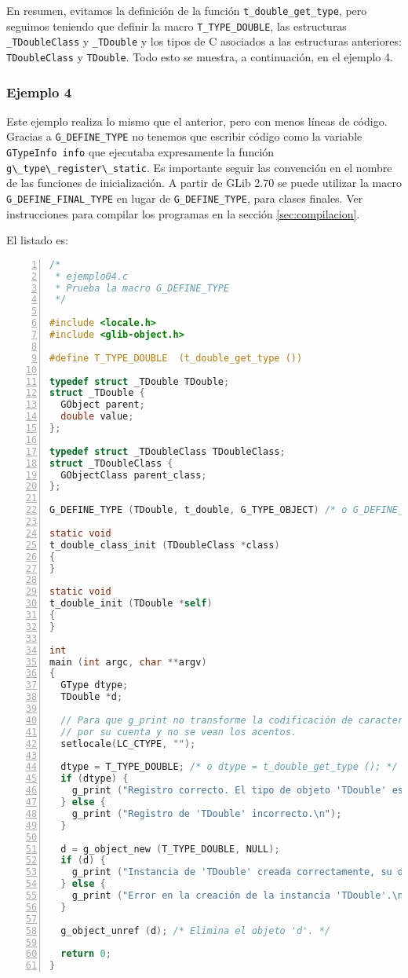 En resumen, evitamos la definición de la función \texttt{t\_double\_get\_type}, pero seguimos
teniendo que definir la macro \texttt{T\_TYPE\_DOUBLE}, las estructuras \texttt{\_TDoubleClass} y
\texttt{\_TDouble} y los tipos de C asociados a las estructuras anteriores: \texttt{TDoubleClass}
y \texttt{TDouble}.
Todo esto se muestra, a continuación, en el ejemplo 4.

\subsubsection{Ejemplo 4}
Este ejemplo realiza lo mismo que el anterior, pero con menos líneas de código.
Gracias a \texttt{G\_DEFINE\_TYPE} no tenemos que escribir código como la variable \texttt{GTypeInfo info}
que  ejecutaba  expresamente la función  \passthrough{\lstinline!g\_type\_register\_static!}.
Es importante seguir las convención en el nombre de las funciones de inicialización.
A partir de \textsf{GLib 2.70} se puede utilizar la macro \texttt{G\_DEFINE\_FINAL\_TYPE} en lugar de
\texttt{G\_DEFINE\_TYPE}, para clases finales.
Ver instrucciones para compilar los programas en la sección \ref{sec:compilacion}.

El listado es:
\begin{lstlisting}[language=C, numbers=left]
/*
 * ejemplo04.c
 * Prueba la macro G_DEFINE_TYPE
 */

#include <locale.h>
#include <glib-object.h>

#define T_TYPE_DOUBLE  (t_double_get_type ())

typedef struct _TDouble TDouble;
struct _TDouble {
  GObject parent;
  double value;
};

typedef struct _TDoubleClass TDoubleClass;
struct _TDoubleClass {
  GObjectClass parent_class;
};

G_DEFINE_TYPE (TDouble, t_double, G_TYPE_OBJECT) /* o G_DEFINE_FINAL_TYPE (...) */

static void
t_double_class_init (TDoubleClass *class)
{
}

static void
t_double_init (TDouble *self)
{
}

int
main (int argc, char **argv)
{
  GType dtype;
  TDouble *d;

  // Para que g_print no transforme la codificación de caracteres
  // por su cuenta y no se vean los acentos.
  setlocale(LC_CTYPE, "");
  
  dtype = T_TYPE_DOUBLE; /* o dtype = t_double_get_type (); */
  if (dtype) {
    g_print ("Registro correcto. El tipo de objeto 'TDouble' es %lx.\n", dtype);
  } else {
    g_print ("Registro de 'TDouble' incorrecto.\n");
  }

  d = g_object_new (T_TYPE_DOUBLE, NULL);
  if (d) {
    g_print ("Instancia de 'TDouble' creada correctamente, su dirección es %p.\n", d);
  } else {
    g_print ("Error en la creación de la instancia 'TDouble'.\n");
  }

  g_object_unref (d); /* Elimina el objeto 'd'. */

  return 0;
}
\end{lstlisting}

